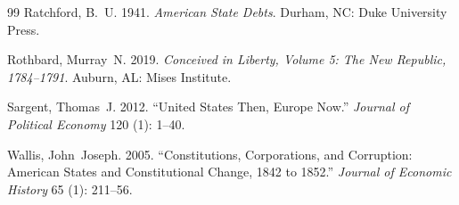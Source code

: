 \documentclass[12pt]{article}
\begin{document}
\begin{thebibliography}{99}
Ratchford, B.~U. 1941.
\newblock \emph{American State Debts}.
\newblock Durham, NC: Duke University Press.

Rothbard, Murray~N. 2019.
\newblock \emph{Conceived in Liberty, Volume 5: The New Republic,
  1784--1791}.
\newblock Auburn, AL: Mises Institute.

Sargent, Thomas~J. 2012.
\newblock ``United States Then, Europe Now.''
\newblock \emph{Journal of Political Economy} 120 (1): 1--40.

Wallis, John~Joseph. 2005.
\newblock ``Constitutions, Corporations, and Corruption: American States
  and Constitutional Change, 1842 to 1852.''
\newblock \emph{Journal of Economic History} 65 (1): 211--56.

\end{thebibliography}
\end{document}
